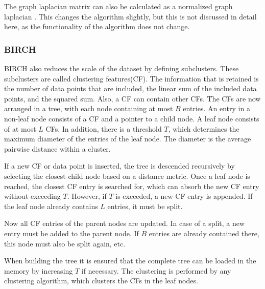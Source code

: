 The graph laplacian matrix can also be calculated as a normalized graph laplacian \cite{spectral_clustering}.
This changes the algorithm slightly, but this is not discussed in detail here, as the functionality of the algorithm does not change.

\subsubsection{BIRCH}
BIRCH also reduces the scale of the dataset by defining subclusters.
These subclusters are called clustering features(CF).
The information that is retained is the number of data points that are included, the linear sum of the included data points, and the squared sum.
Also, a CF can contain other CFs.
The CFs are now arranged in a tree, with each node containing at most $B$ entries.
An entry in a non-leaf node consists of a CF and a pointer to a child node.
A leaf node consists of at most $L$ CFs.
In addition, there is a threshold $T$, which determines the maximum diameter of the entries of the leaf node.
The diameter is the average pairwise distance within a cluster.

If a new CF or data point is inserted, the tree is descended recursively by selecting the closest child node based on a distance metric.
Once a leaf node is reached, the closest CF entry is searched for, which can absorb the new CF entry without exceeding $T$.
However, if $T$ is exceeded, a new CF entry is appended.
If the leaf node already contains $L$ entries, it must be split.

Now all CF entries of the parent nodes are updated.
In case of a split, a new entry must be added to the parent node.
If $B$ entries are already contained there, this node must also be split again, etc.

When building the tree it is ensured that the complete tree can be loaded in the memory by increasing $T$ if necessary.
The clustering is performed by any clustering algorithm, which clusters the CFs in the leaf nodes\cite{birch}.